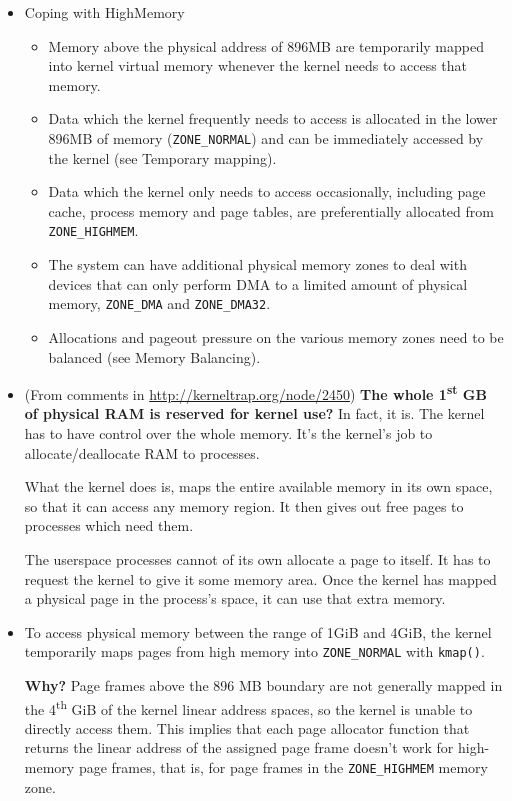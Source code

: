 \begin{itemize}
\item Coping with HighMemory 
  \begin{itemize}
  \item Memory above the physical address of 896MB are temporarily mapped into kernel
    virtual memory whenever the kernel needs to access that memory.
  \item Data which the kernel frequently needs to access is allocated in the lower 896MB
    of memory (\texttt{ZONE\_NORMAL}) and can be immediately accessed by the kernel (see
    Temporary mapping).
  \item Data which the kernel only needs to access occasionally, including page cache,
    process memory and page tables, are preferentially allocated from
    \texttt{ZONE\_HIGHMEM}.
  \item The system can have additional physical memory zones to deal with devices that can
    only perform DMA to a limited amount of physical memory, \texttt{ZONE\_DMA} and
    \texttt{ZONE\_DMA32}.
  \item Allocations and pageout pressure on the various memory zones need to be balanced
    (see Memory Balancing).
  \end{itemize}
\item (From comments in \href{High Memory In The Linux
    Kernel}{http://kerneltrap.org/node/2450}) \textbf{The whole 1\textsuperscript{st} GB
    of physical RAM is reserved for kernel use?} In fact, it is. The kernel has to have
  control over the whole memory. It's the kernel's job to allocate/deallocate RAM to
  processes.

  What the kernel does is, maps the entire available memory in its own space, so that it
  can access any memory region. It then gives out free pages to processes which need them.

  The userspace processes cannot of its own allocate a page to itself. It has to request
  the kernel to give it some memory area. Once the kernel has mapped a physical page in
  the process's space, it can use that extra memory.
\item To access physical memory between the range of 1GiB and 4GiB, the kernel temporarily
  maps pages from high memory into \texttt{ZONE\_NORMAL} with
  \texttt{kmap()}. 

  \textbf{Why?}  Page frames above the 896 MB boundary are not
  generally mapped in the 4\textsuperscript{th} GiB of the kernel linear address spaces,
  so the kernel is unable to directly access them. This implies that each page allocator
  function that returns the linear address of the assigned page frame doesn't work for
  high-memory page frames, that is, for page frames in the \texttt{ZONE\_HIGHMEM} memory
  zone.


\end{itemize}
